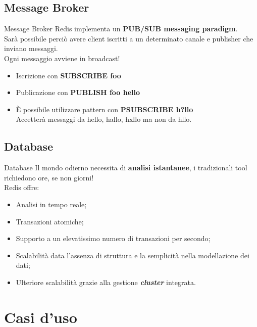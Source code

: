 \documentclass[xcolor=dvipsnames]{beamer}
\begin{document}
    \subsection{Message Broker}
    \begin{frame}{Message Broker}
      Redis implementa un \textbf{PUB/SUB messaging paradigm}. \\
      Sarà possibile perciò avere client iscritti a un determinato canale e publisher che inviano messaggi. \\
      Ogni messaggio avviene in broadcast!
      \begin{itemize}
        \item Iscrizione con \textbf{SUBSCRIBE foo}
        \item Publicazione con \textbf{PUBLISH foo hello}
        \item È possibile utilizzare pattern con \textbf{PSUBSCRIBE h?llo} \\
              Accetterà messaggi da hello, hallo, hxllo ma non da hllo.
      \end{itemize}
    \end{frame}

    \subsection{Database}
      \begin{frame}{Database}
          Il mondo odierno necessita di \textbf{analisi istantanee}, i tradizionali tool richiedono ore, se non giorni! \\
          Redis offre: \\
          \begin{itemize}
            \item Analisi in tempo reale;
            \item Transazioni atomiche;
            \item Supporto a un elevatissimo numero di transazioni per secondo;
            \item Scalabilità data l'assenza di struttura e la semplicità nella modellazione dei dati;
            \item Ulteriore scalabilità grazie alla gestione \textbf{\textit{cluster}} integrata.
          \end{itemize}
      \end{frame}

    \section{Casi d'uso}
      \begin{frame}
        \begin{block}{\centering \huge \insertsectionhead}
        \end{block}
      \end{frame}
\end{document}
